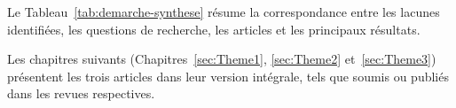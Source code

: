 Le Tableau~\ref{tab:demarche-synthese} résume la correspondance entre les lacunes identifiées, les questions de recherche, les articles et les principaux résultats.

\begin{table}[htbp]
\centering
\caption{Synthèse de la démarche de recherche~: des lacunes aux résultats.}
\label{tab:demarche-synthese}
\end{table}

Les chapitres suivants (Chapitres~\ref{sec:Theme1}, \ref{sec:Theme2} et~\ref{sec:Theme3}) présentent les trois articles dans leur version intégrale, tels que soumis ou publiés dans les revues respectives.
